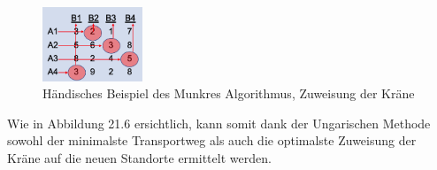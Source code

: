 \begin{figure}
\centering
\includegraphics[width=3cm]{papers/munkres/figures/Ungarische_Methode_Beispiel_Zuw.png}
\caption{Händisches Beispiel des Munkres Algorithmus, Zuweisung der Kräne }
\label{munkres:Vr2}
\end{figure} Wie in Abbildung 21.6 ersichtlich, kann somit dank der Ungarischen Methode sowohl der minimalste Transportweg als auch die optimalste Zuweisung der Kräne auf die neuen Standorte ermittelt werden.